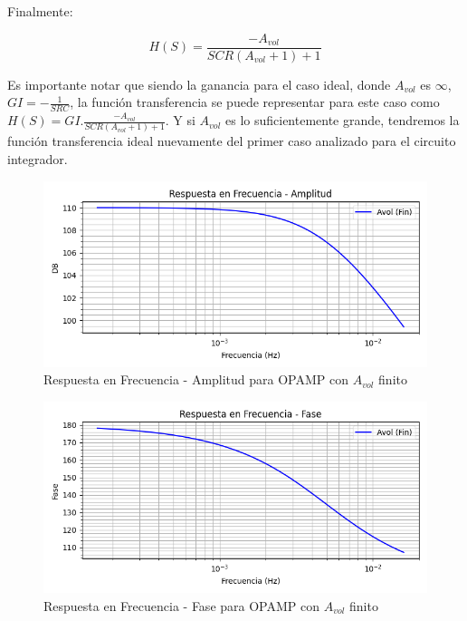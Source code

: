 Finalmente:

$$H(S)= \frac{-A_{vol}}{SCR(A_{vol}+1)+1}$$

Es importante notar que siendo la ganancia para el caso ideal, donde $A_{vol}$ es $\infty$, $ GI = - \frac{1}{SRC}$,  la función
transferencia se puede representar para este caso como $H(S) = GI. \frac{-A_{vol}}{SCR(A_{vol}+1)+1}$. Y
si $A_{vol}$ es lo suficientemente grande, tendremos la función transferencia ideal nuevamente del primer caso analizado para el circuito integrador.

\begin{figure}[H]
    \centering 
    \includegraphics [scale=0.6] {../Ejercicio3-CircuitoIntegradoresyDerivadores/Imagenes/teorico-avol-fin-integrador-amplitud.png} 
    \caption{Respuesta en Frecuencia - Amplitud para OPAMP con $A_{vol}$ finito}
    \label{fig:emptyPlotTool}
\end{figure}

\begin{figure}[H]
    \centering 
    \includegraphics [scale=0.6] {../Ejercicio3-CircuitoIntegradoresyDerivadores/Imagenes/teorico-avol-fin-integrador-fase.png} 
    \caption{Respuesta en Frecuencia - Fase para OPAMP con $A_{vol}$ finito}
    \label{fig:emptyPlotTool}
\end{figure}

